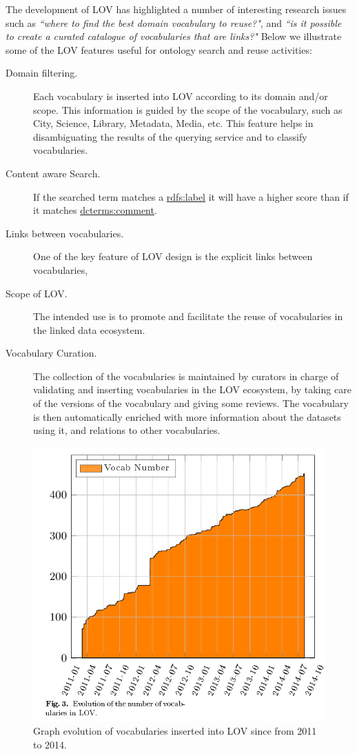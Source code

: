The development of LOV has highlighted a number of interesting research issues such as \textit{``where to find the best domain vocabulary to reuse?"}, and \textit{``is it possible to create a curated catalogue of vocabularies that are links?"}
Below we illustrate some of the LOV features useful for ontology search and reuse activities:
  
 \begin{description}
	\item [Domain filtering.] Each vocabulary is inserted into LOV according to its domain and/or scope. This information is guided by the scope of the vocabulary, such as City, Science, Library, Metadata, Media, etc. This feature helps in disambiguating the results of the querying service and to classify vocabularies. 
	\item [Content aware Search.] If the searched term matches a \url{rdfs:label} it will have a higher score than if it matches \url{dcterms:comment}.
	\item [Links between vocabularies.] One of the key feature of LOV design is the explicit links between vocabularies, 
	 \item [Scope of LOV.]The intended use is to promote and facilitate the reuse of vocabularies in the linked data ecosystem.
	 \item [Vocabulary Curation.]The collection of the vocabularies is maintained by curators in charge of validating and inserting vocabularies in the LOV ecosystem, by taking care of the versions of the vocabulary and giving some reviews. The vocabulary is then automatically enriched with more information about the datasets using it, and relations to other vocabularies.
 \end{description}


\begin{figure}[h!t]
\centering
  \includegraphics[width=\linewidth]{img/LOVEvol.png}
  \caption{Graph evolution of vocabularies inserted into LOV since from 2011 to 2014.}
  \label{fig:translations}
\end{figure}

